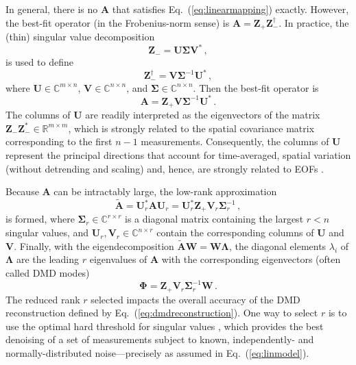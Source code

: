 \documentclass[review,number,sort&compress,12pt]{elsarticle}
\begin{document}
In general, there is no $\mathbf{A}$ that satisfies Eq.~(\ref{eq:linearmapping}) exactly.
However, the best-fit operator (in the Frobenius-norm sense) is $\mathbf{A} = \mathbf{Z}_+ \mathbf{Z}^{\dagger}_-$.
In practice, the (thin) singular value decomposition
\begin{equation}
 \mathbf{Z}_-=\mathbf{U\Sigma V}^*  \, ,
\end{equation}
is used to define 
\begin{equation}
 \mathbf{Z}^{\dagger}_- = \mathbf{V}\boldsymbol{\Sigma}^{-1}\mathbf{U}^* \, ,
\end{equation}
where $\mathbf{U} \in \mathbb{C}^{m\times n}$, $\mathbf{V} \in \mathbb{C}^{n\times n}$, and $\boldsymbol{\Sigma} \in \mathbb{C}^{n\times n}$.  
Then the best-fit operator is
\begin{equation}
 \mathbf{A} = \mathbf{Z}_+ \mathbf{V} \boldsymbol{\Sigma}^{-1}\mathbf{U}^* \, .
\end{equation}
The columns of $\mathbf{U}$ are readily interpreted as the eigenvectors of the matrix $\mathbf{Z}_{-} \mathbf{Z}_{-}^* \in \mathbb{R}^{m\times m}$, which is strongly related to the spatial covariance matrix corresponding to the first $n-1$ measurements.
Consequently, the columns of  $\mathbf{U}$ represent the principal directions that account for time-averaged, spatial variation (without detrending and scaling) and, hence, are strongly related to EOFs \cite{wikle2019sts}.


Because $\mathbf{A}$ can be intractably large, the low-rank approximation
\begin{equation}
 \tilde{\mathbf{A}} = \mathbf{U}^*_r \mathbf{A} \mathbf{U}_r = \mathbf{U}^*_r \mathbf{Z}_+ \mathbf{V}_r\boldsymbol{\Sigma}_r^{-1} \, ,
 \label{eq:lowrank}
\end{equation}
is formed, where $\boldsymbol{\Sigma}_r \in \mathbb{C}^{r\times r}$ is a diagonal matrix containing the largest $r < n$ singular values, and  $\mathbf{U}_r, \mathbf{V}_r \in \mathbb{C}^{n\times r} $ contain the corresponding columns of $\mathbf{U}$ and $\mathbf{V}$.  
Finally, with the eigendecomposition $\tilde{\mathbf{A}}\mathbf{W} = \mathbf{W}\boldsymbol{\Lambda}$, the diagonal elements $\lambda_i$ of $\boldsymbol{\Lambda}$ are the leading $r$ eigenvalues of $\mathbf{A}$ with the corresponding eigenvectors (often called DMD modes)
\begin{equation}
 \boldsymbol{\Phi} = \mathbf{Z}_+ \mathbf{V}_r\boldsymbol{\Sigma}_r^{-1}\mathbf{W} \, .
\end{equation}
The reduced rank $r$ selected impacts the overall accuracy of the DMD reconstruction defined by Eq.~(\ref{eq:dmdreconstruction}). 
One way to select $r$ is to use the optimal hard threshold for singular values \cite{gavish2014optimal}, which provides the best denoising of a set of measurements subject to known, independently- and normally-distributed noise---precisely as assumed in Eq.~(\ref{eq:linmodel}).  
\end{document}

